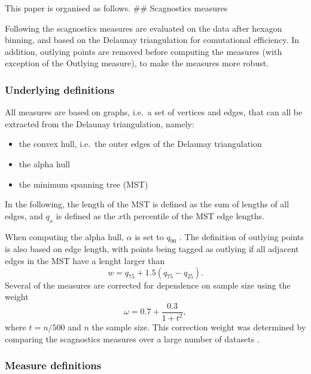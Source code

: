 This paper is organised as follows. \#\# Scagnostics measures

Following \citet{scag} the scagnostics measures are evaluated on the
data after hexagon binning, and based on the Delaunay triangulation for
comutational efficiency. In addition, outlying points are removed before
computing the measures (with exception of the Outlying measure), to make
the measures more robust.

\hypertarget{underlying-definitions}{%
\subsubsection{Underlying definitions}\label{underlying-definitions}}

All measures are based on graphs, i.e.~a set of vertices and edges, that
can all be extracted from the Delaunay triangulation, namely:

\begin{itemize}
\tightlist
\item
  the convex hull, i.e.~the outer edges of the Delaunay triangulation
\item
  the alpha hull \citep{1056714}
\item
  the minimum spanning tree (MST) \citep{kruskal1956}
\end{itemize}

In the following, the length of the MST is defined as the sum of lengths
of all edges, and \(q_x\) is defined as the \(x\)th percentile of the
MST edge lengths.

When computing the alpha hull, \(\alpha\) is set to \(q_{90}\)
\citep{scag}. The definition of outlying points is also based on edge
length, with points being tagged as outlying if all adjacent edges in
the MST have a lenght larger than \begin{equation}
w = q_{75} + 1.5 ( q_{75} - q_{25}).
\label{eq:w}
\end{equation} Several of the measures are corrected for dependence on
sample size using the weight \begin{equation}
\omega = 0.7 + \frac{0.3}{1+t^2},
\end{equation} where \(t = n / 500\) and \(n\) the sample size. This
correction weight was determined by comparing the scagnostics measures
over a large number of datasets \citep{scag}.

\hypertarget{measure-definitions}{%
\subsubsection{Measure definitions}\label{measure-definitions}}

